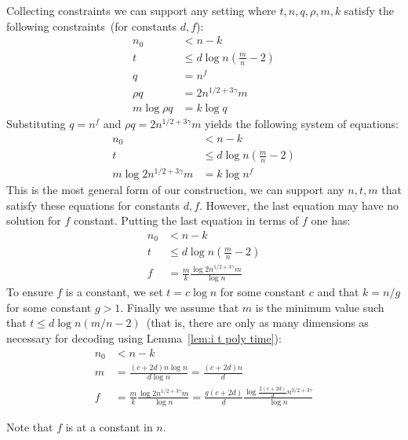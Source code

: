 \documentclass[11pt]{article}
\newcommand{\lemref}[1]{\mbox{Lemma~\ref{#1}}}
\newcommand{\authnote}[2]{{\textcolor{red}{\textsf{#1 notes: }\textcolor{blue}{ #2}}\marginpar{\textcolor{red}{\textbf{!!!!!}}}}}
\newcommand{\authnote}[2]{}
\newcommand{\xnote}[1]{{\authnote{Xianrui}{#1}}}
\begin{document}
Collecting constraints we can support any setting where $t, n, q, \rho, m, k$ satisfy the following constraints~(for constants $d, f$):
\begin{align*}
n_0&< n -k \\
t&\leq d \log n\left(\frac{m}{n}-2\right)\\
q &= n^f\\
\rho q  &= 2n^{1/2+3\gamma}m\\
m\log \rho q &= k \log q
\end{align*}
Substituting $q = n^f$ and $\rho q = 2n^{1/2+3\gamma}m$ yields the following system of equations:
\begin{align*}
n_0&< n - k\\
t&\leq d\log n\left(\frac{m}{n}-2\right)\\
m \log 2n^{1/2+3\gamma}m &= k \log n^f
\end{align*}
This is the most general form of our construction, we can support any $n, t, m$ that satisfy these equations for constants $d, f$.  However, the last equation may have no solution for $f$ constant.  Putting the last equation in terms of $f$ one has:
\begin{align*}
n_0&< n -k \\
t&\leq d\log n\left(\frac{ m }{n} -2\right)\\
f &= \frac{m}{k}\frac{\log 2n^{1/2+3\gamma} m}{\log n}
\end{align*}
To ensure $f$ is a constant, we set $t = c \log n$ for some constant $c$ and that $k = n /g$ for some constant $g> 1$.  Finally we assume that $m$ is the minimum value such that $t \leq d \log n(m/n-2)$~(that is, there are only as many dimensions as necessary for decoding using \lemref{lem:i t poly time}):
\begin{align*}
n_0&< n -k \\
m &= \frac{(c+2d)n \log n}{d \log n} = \frac{(c+2d)n}{d}\\
f &= \frac{m}{k}\frac{\log 2n^{1/2+3\gamma}m}{\log n} = \frac{g(c+2d)}{d}\frac{\log \frac{2(c+2d)}{d} n^{3/2+3\gamma}}{\log n}
\end{align*}

Note that $f$ is at a constant in $n$.
\end{document}
